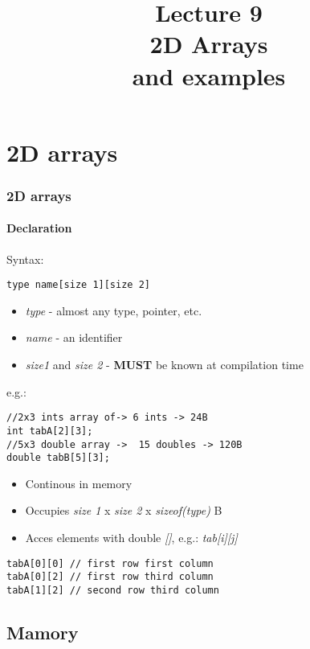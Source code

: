 \documentclass[10pt]{beamer}
\title{Lecture 9\\2D Arrays\\{\tiny and examples}}
\date{}
\begin{document}
\frame{
    \titlepage
}

\section{2D arrays}

\begin{frame}[fragile]
  \frametitle{2D arrays}
  \framesubtitle{Declaration}
Syntax:
\begin{lstlisting}
type name[size 1][size 2]
\end{lstlisting}
\begin{itemize}
  \item \textit{type} - almost any type, pointer, etc.
  \item \textit{name} - an identifier
  \item \textit{size1} and \textit{size 2} - \textbf{MUST} be known at compilation time 
\end{itemize}
e.g.:
\begin{lstlisting}
//2x3 ints array of-> 6 ints -> 24B
int tabA[2][3];
//5x3 double array ->  15 doubles -> 120B
double tabB[5][3];
\end{lstlisting}
\begin{itemize}
  \item Continous in memory
  \item Occupies \textit{size 1} x \textit{size 2} x \textit{sizeof(type)} B
  \item Acces elements with double \textit{[]}, e.g.: \textit{tab[i][j]}
\end{itemize}
\begin{lstlisting}
tabA[0][0] // first row first column
tabA[0][2] // first row third column
tabA[1][2] // second row third column
\end{lstlisting}
\end{frame}

\subsection{Mamory}
\end{document}
